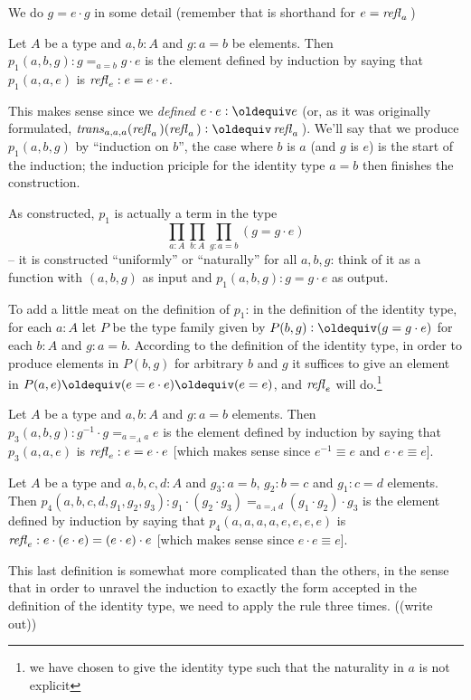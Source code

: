 We do $g=e\cdot g$ in some detail (remember that is shorthand for $e=\mathop{{\it refl}_{a}}{}$)
\begin{definition}\label{def:p1}
  Let $A$ be a type and $a, b:A$ and $g:a=b$ be elements.  Then $p_1(a,b,g):g=_{a=b}g\cdot e$ is the element defined by induction by saying that $p_1(a,a,e)$ is $\mathop{{\it refl}_{e}}:e=e\cdot e$.
\end{definition}
\begin{remark}
  This makes sense since we \emph{defined} $e\cdot e\defequi e$ (or, as it was originally formulated, $\trans_{a,a,a}(\refl a{})(\refl a{})\defequi \refl a{}$).  We'll say that we produce $p_1(a,b,g)$ by ``induction on $b$'', the case where $b$ is $a$ (and $g$ is $e$) is the start of the induction; the induction priciple for the identity type $a=b$ then finishes the construction.

As constructed, $p_1$ is actually a term in the type
$$\prod_{a:A}\prod_{b:A}\prod_{g:a=b}(g=g\cdot e)$$ -- it is constructed ``uniformly'' or ``naturally'' for all $a,b,g$: think of it as a function with $(a,b,g)$ as input and $p_1(a,b,g):g=g\cdot e$ as output.

To add a little meat on the definition of $p_1$: in the definition of the identity type, for each $a:A$ let $P$ be the type family given by $P(b,g)\defequi (g=g\cdot e)$ for each $b:A$ and $g:a=b$.  According to the definition of the identity type, in order to produce elements in $P(b,g)$ for arbitrary $b$ and $g$ it suffices to give an element in $P(a,e)\oldequiv (e=e\cdot e)\oldequiv (e=e)$, and $\mathop{{\it refl}_{e}}$ will do.\footnote{we have chosen to give the identity type such that the naturality in $a$ is not explicit}
\end{remark}
\begin{definition}\label{def:p3}
  Let $A$ be a type and $a,b:A$ and $g:a=b$ elements.  Then $p_3(a,b,g):g^{-1}\cdot g=_{a=_Aa} e$ is the element defined by induction by saying that $p_3(a,a,e)$ is $\mathop{{\it refl}_{e}}:e=e\cdot e$ [which makes sense since $e^{-1}\equiv e$ and $e\cdot e\equiv e$].
\end{definition}
\begin{definition}\label{def:p4}
  Let $A$ be a type and $a,b,c,d:A$ and $g_3:a=b$, $g_2:b=c$ and $g_1:c=d$ elements.  Then $p_4(a,b,c,d,g_1,g_2,g_3):g_1\cdot(g_2\cdot g_3)=_{a=_Ad}(g_1\cdot g_2)\cdot g_3$ is the element defined by induction by saying that $p_4(a,a,a,a,e,e,e,e)$ is $\mathop{{\it refl}_{e}}:e\cdot(e\cdot e)=(e\cdot e)\cdot e$ [which makes sense since $e\cdot e\equiv e$].
\end{definition}
\begin{remark}
  This last definition is somewhat more complicated than the others, in the sense that in order to unravel the induction to exactly the form accepted in the definition of the identity type, we need to apply the rule three times.  ((write out))
\end{remark}

